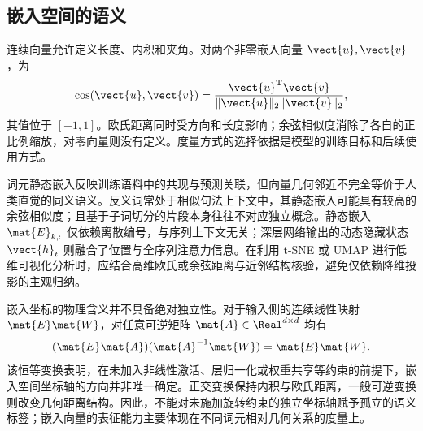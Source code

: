 \documentclass[../textbook.tex]{subfiles}
\begin{document}
\subsection{嵌入空间的语义}
连续向量允许定义长度、内积和夹角。对两个非零嵌入向量 $\vect{u},\vect{v}$，为
\begin{equation}
 \operatorname{cos}(\vect{u},\vect{v})=\frac{\vect{u}^{\mathrm{T}}\vect{v}}{\|\vect{u}\|_2\|\vect{v}\|_2},
\end{equation}
其值位于 $[-1,1]$。欧氏距离同时受方向和长度影响；余弦相似度消除了各自的正比例缩放，对零向量则没有定义。度量方式的选择依据是模型的训练目标和后续使用方式。

词元静态嵌入反映训练语料中的共现与预测关联，但向量几何邻近不完全等价于人类直觉的同义语义。反义词常处于相似句法上下文中，其静态嵌入可能具有较高的余弦相似度；且基于子词切分的片段本身往往不对应独立概念。静态嵌入 $\mat{E}_{k,:}$ 仅依赖离散编号，与序列上下文无关；深层网络输出的动态隐藏状态 $\vect{h}_t$ 则融合了位置与全序列注意力信息。在利用 t-SNE 或 UMAP 进行低维可视化分析时，应结合高维欧氏或余弦距离与近邻结构核验，避免仅依赖降维投影的主观归纳。

嵌入坐标的物理含义并不具备绝对独立性。对于输入侧的连续线性映射 $\mat{E}\mat{W}$，对任意可逆矩阵 $\mat{A}\in\Real^{d\times d}$ 均有
\begin{equation}
 (\mat{E}\mat{A})(\mat{A}^{-1}\mat{W})=\mat{E}\mat{W}.
\end{equation}
该恒等变换表明，在未加入非线性激活、层归一化或权重共享等约束的前提下，嵌入空间坐标轴的方向并非唯一确定。正交变换保持内积与欧氏距离，一般可逆变换则改变几何距离结构。因此，不能对未施加旋转约束的独立坐标轴赋予孤立的语义标签；嵌入向量的表征能力主要体现在不同词元相对几何关系的度量上。

\chapterreferences
\myendchapterdocument
\end{document}

